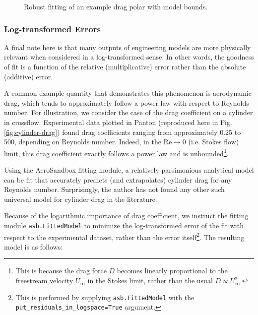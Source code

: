 \begin{figure}[H]
    \centering
%    
    \ifdraft{}{}
    \caption{Robust fitting of an example drag polar with model bounds.}
    \label{fig:constrained-fitting}
\end{figure}

\subsubsection{Log-transformed Errors}

A final note here is that many outputs of engineering models are more physically relevant when considered in a log-transformed sense. In other words, the goodness of fit is a function of the relative (multiplicative) error rather than the absolute (additive) error.

A common example quantity that demonstrates this phenomenon is aerodynamic drag, which tends to approximately follow a power law with respect to Reynolds number. For illustration, we consider the case of the drag coefficient on a cylinder in crossflow. Experimental data plotted in Panton \cite{Panton} (reproduced here in Fig. \ref{fig:cylinder-drag}) found drag coefficients ranging from approximately 0.25 to 500, depending on Reynolds number. Indeed, in the $\text{Re} \to 0$ (i.e. Stokes flow) limit, this drag coefficient exactly follows a power law and is unbounded\footnote{This is because the drag force $D$ becomes linearly proportional to the freestream velocity $U_\infty$ in the Stokes limit, rather than the usual $D \propto U_\infty^2$.}.

Using the AeroSandbox fitting module, a relatively parsimonious analytical model can be fit that accurately predicts (and extrapolates) cylinder drag for any Reynolds number. Surprisingly, the author has not found any other such universal model for cylinder drag in the literature.

Because of the logarithmic importance of drag coefficient, we instruct the fitting module \texttt{asb.FittedModel} to minimize the log-transformed error of the fit with respect to the experimental dataset, rather than the error itself\footnote{This is performed by supplying \texttt{asb.FittedModel} with the \texttt{put_residuals_in_logspace=True} argument.}. The resulting model is as follows:

\newcommand{\logt}{\log_{10}}
\newcommand{\logtr}{\logt(\text{Re})}

